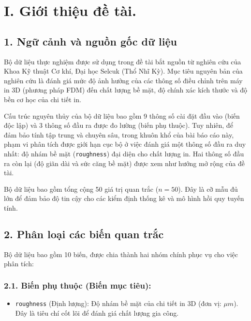 \section{I. Giới thiệu đề tài.}
\subsection{1. Ngữ cảnh và nguồn gốc dữ liệu}
Bộ dữ liệu thực nghiệm được sử dụng trong đề tài bắt nguồn từ nghiên cứu của Khoa Kỹ thuật Cơ khí, Đại học Selcuk (Thổ Nhĩ Kỳ). Mục tiêu nguyên bản của nghiên cứu là đánh giá mức độ ảnh hưởng của các thông số điều chỉnh trên máy in 3D (phương pháp FDM) đến chất lượng bề mặt, độ chính xác kích thước và độ bền cơ học của chi tiết in.

Cấu trúc nguyên thủy của bộ dữ liệu bao gồm 9 thông số cài đặt đầu vào (biến độc lập) và 3 thông số đầu ra được đo lường (biến phụ thuộc). Tuy nhiên, để đảm bảo tính tập trung và chuyên sâu, trong khuôn khổ của bài báo cáo này, phạm vi phân tích được giới hạn cục bộ ở việc đánh giá một thông số đầu ra duy nhất: độ nhám bề mặt (\texttt{roughness}) đại diện cho chất lượng in. Hai thông số đầu ra còn lại (độ giãn dài và sức căng bề mặt) được xem như hướng mở rộng của đề tài.

Bộ dữ liệu bao gồm tổng cộng 50 giá trị quan trắc ($n = 50$). Đây là cỡ mẫu đủ lớn để đảm bảo độ tin cậy cho các kiểm định thống kê và mô hình hồi quy tuyến tính.

\subsection{2. Phân loại các biến quan trắc}
Bộ dữ liệu bao gồm 10 biến, được chia thành hai nhóm chính phục vụ cho việc phân tích:

\subsubsection{2.1. Biến phụ thuộc (Biến mục tiêu):}
\begin{itemize}
    \item \texttt{roughness} (Định lượng): Độ nhám bề mặt của chi tiết in 3D (đơn vị: $\mu m$). Đây là tiêu chí cốt lõi để đánh giá chất lượng gia công.
\end{itemize}


